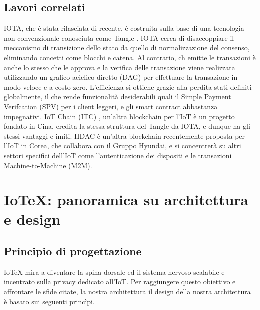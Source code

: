 \documentclass[a4paper,12pt]{article}
\begin{document}
\subsection{Lavori correlati}
IOTA, che è stata rilasciata di recente, è costruita sulla base di una tecnologia non convenzionale conosciuta come Tangle \cite{24}. IOTA cerca di disaccoppiare il meccanismo di transizione dello stato da quello di normalizzazione del consenso, eliminando concetti come blocchi e catena. Al contrario, ch emitte le transazioni è anche lo stesso che le approva e la verifica delle transazione viene realizzata utilizzando un grafico aciclico diretto (DAG) per effettuare la transazione in modo veloce e a costo zero. L'efficienza si ottiene grazie alla perdita stati definiti globalmente, il che rende funzionalità desiderabili quali il Simple Payment Verifcation (SPV) per i client leggeri, e gli smart contract abbastanza impegnativi. IoT Chain (ITC) \cite{16}, un'altra blockchain per l'IoT è un progetto fondato in Cina, eredita la stessa struttura del Tangle da IOTA, e dunque ha gli stessi vantaggi e imiti. HDAC \cite{13} è un'altra blockchain recentemente proposta per l'IoT in Corea, che collabora con il Gruppo Hyundai, e si concentrerà su altri settori specifici dell'IoT come l'autenticazione dei dispositi e le transazioni Machine-to-Machine (M2M).


\section{IoTeX: panoramica su architettura e design}

\subsection{Principio di progettazione}
IoTeX mira a diventare la spina dorsale ed il sistema nervoso scalabile e incentrato sulla privacy dedicato all'IoT. Per raggiungere questo obiettivo e affrontare le sfide citate, la nostra architettura il design della nostra architettura è basato sui seguenti princìpi.
\end{document}
